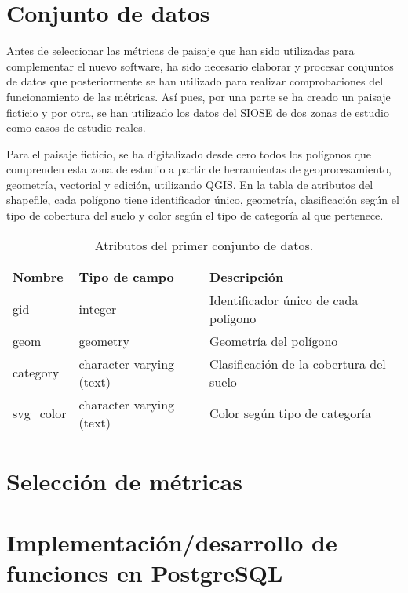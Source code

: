 \section{Conjunto de datos}
Antes de seleccionar las métricas de paisaje que han sido utilizadas para complementar el nuevo software, ha sido necesario elaborar y procesar conjuntos de datos que posteriormente se han utilizado para realizar comprobaciones del funcionamiento de las métricas. Así pues, por una parte se ha creado un paisaje ficticio y por otra, se han utilizado los datos del SIOSE de dos zonas de estudio como casos de estudio reales.

Para el paisaje ficticio, se ha digitalizado desde cero todos los polígonos que comprenden esta zona de estudio a partir de herramientas de geoprocesamiento, geometría, vectorial y edición, utilizando QGIS. En la tabla de atributos del shapefile, cada polígono tiene identificador único, geometría, clasificación según el tipo de cobertura del suelo y color según el tipo de categoría al que pertenece.

\begin{table}[]
\centering
\caption{Atributos del primer conjunto de datos.}
\label{my-label}
\begin{tabular}{@{}lll@{}}
\toprule
\textbf{Nombre} & \textbf{Tipo de campo}   & \textbf{Descripción}                    \\ \midrule
gid             & integer                  & Identificador único de cada polígono    \\
geom            & geometry                 & Geometría del polígono                  \\
category        & character varying (text) & Clasificación de la cobertura del suelo \\
svg\_color      & character varying (text) & Color según tipo de categoría           \\ \bottomrule
\end{tabular}
\end{table}


\section{Selección de métricas}

\section{Implementación/desarrollo de funciones en PostgreSQL}

